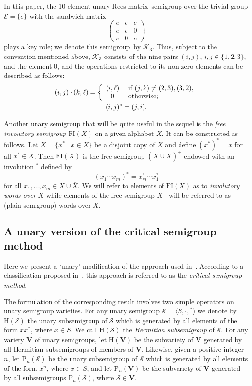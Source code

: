 \documentclass[11pt,reqno]{amsart}
\numberwithin{equation}{section}
\theoremstyle{remark}
\def\Vc{\mathbf{V}}
\def\H{\mathrm H}
\def\P{\mathrm P\!}
\def\Rm{Rees matrix}
\def\sm{semi\-group}
\begin{document}
In this paper, the 10-element unary \Rm\ semigroup over the
trivial group $\mathcal{E}=\{e\}$ with the sandwich matrix
$$\begin{pmatrix}
e & e & e\\
e & e & 0\\
e & 0 & e
\end{pmatrix}$$
plays a key role; we denote this \sm\ by $\mathcal{K}_3$. Thus,
subject to the convention mentioned above, $\mathcal{K}_3$
consists of the nine pairs $(i,j)$, $i,j\in\{1,2,3\}$, and the
element $0$, and the operations restricted to its non-zero
elements can be described as follows:
\begin{gather}
\label{operations in C3}
(i,j)\cdot(k,\ell)=\left\{\begin{array}{cl}
(i,\ell)&\ \text{if}\ (j,k)\ne(2,3),(3,2),\\
0 &\ \text{otherwise};
\end{array}\right.\\
(i,j)^* = (j,i)\notag.
\end{gather}

Another unary semigroup that will be quite useful in the sequel is
the \emph{free involutory semigroup} $\mathrm{FI}(X)$ on a given
alphabet $X$. It can be constructed as follows. Let
$\overline{X}=\{x^*\mid x\in X\}$ be a disjoint copy of $X$ and
define $(x^*)^*=x$ for all $x^*\in \overline{X}$. Then
$\mathrm{FI}(X)$ is the free semigroup $(X\cup\overline{X})^+$
endowed with an involution ${}^*$ defined by
$$(x_1\cdots x_m)^* = x_m^*\cdots x_1^*$$
for all $x_1,\dots,x_m\in X\cup \overline{X}$. We will refer to
elements of $\mathrm{FI}(X)$ as to \emph{involutory words over
$X$} while elements of the free semigroup $X^+$ will be referred
to as (plain semigroup) words over $X$.

\subsection{A unary version of the critical semigroup method}
Here we present a `unary' modification of the approach used
in~\cite{V}. According to a classification proposed
in~\cite{volkovjaponicae}, this approach is referred to as the
\emph{critical semigroup method}.

The formulation of the corresponding result involves two simple
operators on unary semigroup varieties. For any unary semigroup
$\mathcal{S}=\langle S,\cdot,{}^*\rangle$ we denote by
$\H(\mathcal{S})$ the unary subsemigroup of $\mathcal{S}$ which is
generated by all elements of the form $xx^*$, where $x\in S$. We
call $\H(\mathcal{S})$ the \emph{Hermitian subsemigroup} of
$\mathcal{S}$. For any variety $\Vc$ of unary semigroups, let
$\H(\Vc)$ be the subvariety of $\Vc$ generated by all Hermitian
subsemigroups of members of $\Vc$. Likewise, given a positive
integer $n$, let $\P_n(\mathcal{S})$ be the unary subsemigroup of
$\mathcal{S}$ which is generated by all elements of the form
$x^n$, where $x\in S$, and let $\P_n(\Vc)$ be the subvariety of
$\Vc$ generated by all subsemigroups $\P_n(\mathcal{S})$, where
$\mathcal{S}\in \Vc$.
\end{document}
